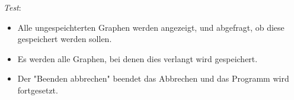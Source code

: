 \emph{Test}:
\begin{itemize}
\item Alle ungespeichterten Graphen werden angezeigt, und abgefragt, ob diese
  gespeichert werden sollen.
\item Es werden alle Graphen, bei denen dies verlangt wird gespeichert.
\item Der "Beenden abbrechen" beendet das Abbrechen und das Programm wird fortgesetzt.
\end{itemize}